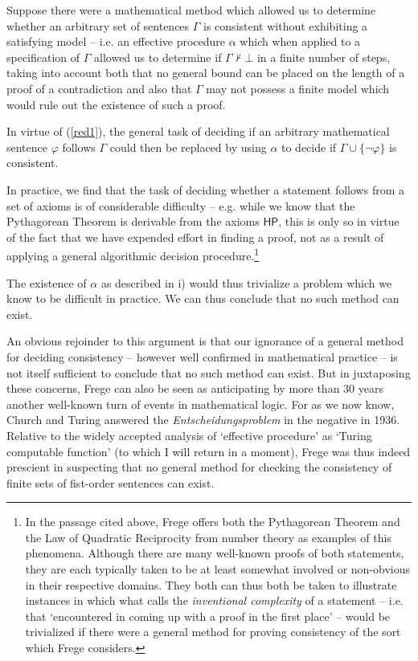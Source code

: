 \documentclass[11pt,fleqn,leqno]{article}
\def\phi{\varphi}
\def\proves{\vdash}
\begin{document}
\begin{example}
\begin{compactenum}[i)]
\item Suppose there were a mathematical method which allowed us to determine whether an arbitrary set of sentences $\Gamma$ is consistent without exhibiting a satisfying model -- i.e. an effective procedure $\alpha$ which when applied to a specification of $\Gamma$ allowed us to determine if $\Gamma \not\proves \bot$ in a finite number of steps, taking into account both that no general bound can be placed on the length of a proof of a contradiction and also that $\Gamma$ may not possess a finite model which would rule out the existence of such a proof.
\item In virtue of (\ref{red1}), the general task of deciding if an arbitrary mathematical sentence $\phi$ follows $\Gamma$ could then be replaced by using $\alpha$ to decide if $\Gamma \cup \{\neg \phi\}$ is consistent.
\item In practice, we find that the task of deciding whether a statement follows from a set of axioms is of considerable difficulty -- e.g. while we know that the Pythagorean Theorem is derivable from the axioms $\mathsf{HP}$, this is only so in virtue of the fact that we have expended effort in finding a proof, not as a result of applying a general algorithmic decision procedure.\footnote{In the passage cited above, Frege offers both the Pythagorean Theorem and the Law of Quadratic Reciprocity from number theory as examples of this phenomena.   Although there are many well-known proofs of both statements, they are each typically taken to be at least somewhat involved or non-obvious in their respective domains.   They both can thus both be taken to illustrate instances in which what \citet[p. 376]{Detlefsen1990} calls the \textsl{inventional complexity} of a statement --  i.e. that `encountered in coming up with a proof in the first place' -- would be trivialized if there were a general method for proving consistency of the sort which Frege considers.}
\item The existence of $\alpha$ as described in i) would thus trivialize a problem which we know to be difficult in practice.  We can thus conclude that no such method can exist.  
\end{compactenum} 
\end{example}

An obvious rejoinder to this argument is that our ignorance of a general method for deciding consistency -- however well confirmed in mathematical practice -- is not itself sufficient to conclude that no such method can exist.    But in juxtaposing these concerns, Frege can also be seen as anticipating by more than 30 years another well-known turn of events in mathematical logic.   For as we now know, Church and Turing answered the \textsl{Entscheidungsproblem} in the negative in 1936.   Relative to the widely accepted analysis of `effective procedure' as `Turing computable function' (to which I will return in a moment), Frege was thus indeed prescient in suspecting that no general method for checking the consistency of finite sets of fist-order sentences can exist.
\end{document}
